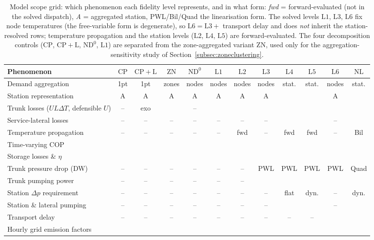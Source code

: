 \documentclass[a4paper,fleqn]{cas-sc}
\newcommand{\CP}{\ensuremath{\mathrm{CP}}}      %
\newcommand{\CPL}{\ensuremath{\mathrm{CP{+}L}}} %
\newcommand{\ZN}{\ensuremath{\mathrm{ZN}}}      %
\newcommand{\NDz}{\ensuremath{\mathrm{ND^{0}}}} %
\newcommand{\Lone}{\ensuremath{\mathrm{L1}}}    %
\newcommand{\Ltwo}{\ensuremath{\mathrm{L2}}}    %
\newcommand{\Lthree}{\ensuremath{\mathrm{L3}}}  %
\newcommand{\Lfour}{\ensuremath{\mathrm{L4}}}   %
\newcommand{\Lfive}{\ensuremath{\mathrm{L5}}}   %
\newcommand{\Lsix}{\ensuremath{\mathrm{L6}}}    %
\newcommand{\NLref}{\ensuremath{\mathrm{NL}}}   %
\renewcommand{\checkmark}{\ding{51}}
\begin{document}
\begin{table}[htbp]
\centering
\caption{Model scope grid: which phenomenon each fidelity level represents, and in what
form: \emph{fwd} = forward-evaluated (not in the solved dispatch), \emph{A} = aggregated
station, PWL/Bil/Quad the linearisation form. The solved levels $\Lone$, $\Lthree$, $\Lsix$
fix node temperatures (the free-variable form is degenerate), so $\Lsix=\Lthree+$ transport
delay and does \emph{not} inherit the station-resolved rows; temperature propagation and the
station levels ($\Ltwo$, $\Lfour$, $\Lfive$) are forward-evaluated. The four decomposition
controls ($\CP$, $\CPL$, $\NDz$, $\Lone$) are separated from the zone-aggregated variant
$\ZN$, used only for the aggregation-sensitivity study of Section~\ref{subsec:zoneclustering}.}
\label{tab:designgrid}
\footnotesize
\setlength{\tabcolsep}{3pt}
\begin{tabular}{@{}lcc|c|cccccccc@{}}
\hline
Phenomenon & $\CP$ & $\CPL$ & $\ZN$ & $\NDz$ & $\Lone$ & $\Ltwo$ & $\Lthree$ & $\Lfour$ & $\Lfive$ & $\Lsix$ & $\NLref$ \\
\hline
Demand aggregation & 1pt & 1pt & zones & nodes & nodes & nodes & nodes & stat. & stat. & nodes & stat. \\
Station representation & A & A & A & A & A & A & A & \checkmark & \checkmark & A & \checkmark \\
Trunk losses ($U\!L\Delta T$, defensible $U$) & -- & exo & \checkmark & -- & \checkmark & \checkmark & \checkmark & \checkmark & \checkmark & \checkmark & \checkmark \\
Service-lateral losses & -- & -- & -- & -- & -- & -- & -- & \checkmark & \checkmark & -- & \checkmark \\
Temperature propagation & -- & -- & -- & -- & -- & fwd & -- & fwd & fwd & -- & Bil \\
Time-varying COP & \checkmark & \checkmark & \checkmark & \checkmark & \checkmark & \checkmark & \checkmark & \checkmark & \checkmark & \checkmark & \checkmark \\
Storage losses \& $\eta$ & \checkmark & \checkmark & \checkmark & \checkmark & \checkmark & \checkmark & \checkmark & \checkmark & \checkmark & \checkmark & \checkmark \\
Trunk pressure drop (DW) & -- & -- & -- & -- & -- & -- & PWL & PWL & PWL & PWL & Quad \\
Trunk pumping power & -- & -- & -- & -- & -- & -- & \checkmark & \checkmark & \checkmark & \checkmark & \checkmark \\
Station $\Delta p$ requirement & -- & -- & -- & -- & -- & -- & -- & flat & dyn. & -- & dyn. \\
Station \& lateral pumping & -- & -- & -- & -- & -- & -- & -- & \checkmark & \checkmark & -- & \checkmark \\
Transport delay & -- & -- & -- & -- & -- & -- & -- & -- & -- & \checkmark & \checkmark \\
Hourly grid emission factors & \checkmark & \checkmark & \checkmark & \checkmark & \checkmark & \checkmark & \checkmark & \checkmark & \checkmark & \checkmark & \checkmark \\
\hline
\end{tabular}
\end{table}
\end{document}
